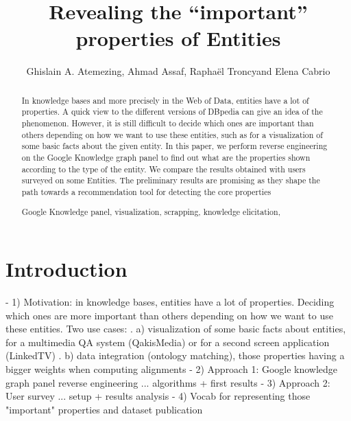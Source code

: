 \documentclass[runningheads,a4paper]{llncs}
\newcommand{\keywords}[1]{\par\addvspace\baselineskip
\noindent\keywordname\enspace\ignorespaces#1}
\begin{document}
\title{Revealing the ``important'' properties of Entities}

\author{Ghislain A. Atemezing, Ahmad Assaf, Rapha\"{e}l Troncyand Elena Cabrio }



\maketitle


\begin{abstract}
In knowledge bases and more precisely in the Web of Data, entities have a lot of properties. A quick view to the different versions of DBpedia can give an idea of the phenomenon. However, it is still difficult to decide which ones are important than others depending on how we want to use these entities, such as for a visualization of some basic facts about the given entity. In this paper, we perform reverse engineering on the Google Knowledge graph panel to find out what are the properties shown according to the type of the entity. We compare the results obtained with users surveyed on some Entities. The preliminary results are promising as they shape the path towards a recommendation tool for detecting the core properties 
\keywords{Google Knowledge panel, visualization, scrapping, knowledge elicitation,}
\end{abstract}


\section{Introduction}
\label{sec:intro}
- 1) Motivation: in knowledge bases, entities have a lot of properties. Deciding which ones are more important than others depending on how we want to use these entities. Two use cases:
   . a) visualization of some basic facts about entities, for a multimedia QA system (QakisMedia) or for a second screen application (LinkedTV)
   . b) data integration (ontology matching), those properties having a bigger weights when computing alignments
 - 2) Approach 1: Google knowledge graph panel reverse engineering ... algorithms + first results
 - 3) Approach 2: User survey ... setup + results analysis
 - 4) Vocab for representing those "important" properties and dataset publication
\end{document}
